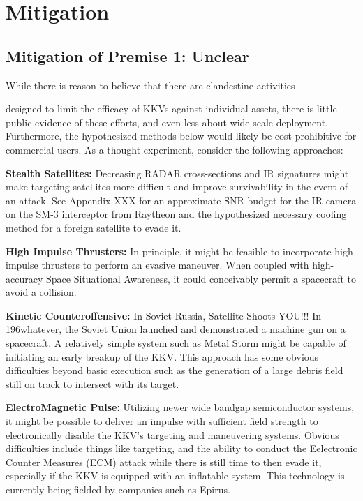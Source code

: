 \section{Mitigation}

\subsection{Mitigation of Premise 1: Unclear}
While there is reason to believe that there are clandestine activities

designed to limit the efficacy of KKVs against individual assets,
there is little public evidence of these efforts, and even less about
wide-scale deployment.  Furthermore, the hypothesized methods below
would likely be cost prohibitive for commercial users.  As a thought
experiment, consider the following approaches:

\textbf{Stealth Satellites:} Decreasing RADAR cross-sections and IR
signatures might make targeting satellites more difficult and improve
survivability in the event of an attack.  See Appendix XXX for an
approximate SNR budget for the IR camera on the SM-3 interceptor from
Raytheon and the hypothesized necessary cooling method for a foreign
satellite to evade it.

\textbf{High Impulse Thrusters:} In principle, it might be feasible to
incorporate high-impulse thrusters to perform an evasive maneuver.
When coupled with high-accuracy Space Situational Awareness, it could
conceivably permit a spacecraft to avoid a collision.

\textbf{Kinetic Counteroffensive:} In Soviet Russia, Satellite Shoots
YOU!!!  In 196whatever, the Soviet Union launched and demonstrated a
machine gun on a spacecraft.  A relatively simple system such as Metal
Storm might be capable of initiating an early breakup of the KKV.
This approach has some obvious difficulties beyond basic execution
such as the generation of a large debris field still on track to
intersect with its target.

\textbf{ElectroMagnetic Pulse:} Utilizing newer wide bandgap
semiconductor systems, it might be possible to deliver an impulse with
sufficient field strength to electronically disable the KKV's
targeting and maneuvering systems.  Obvious difficulties include
things like targeting, and the ability to conduct the Eelectronic
Counter Measures (ECM) attack while there is still time to then evade
it, especially if the KKV is equipped with an inflatable system.  This
technology is currently being fielded by companies such as
Epirus.\cite[epirus]{fixme}

